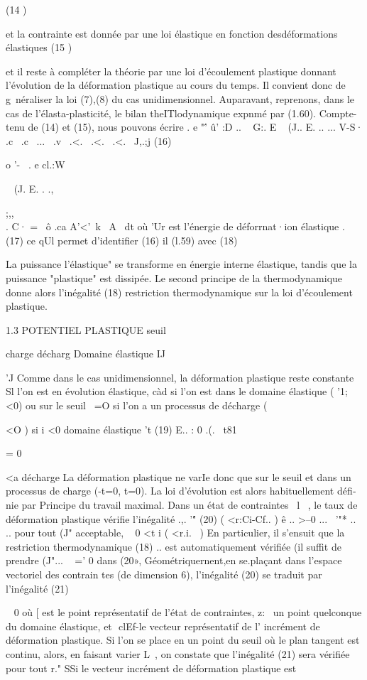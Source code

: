 {{{{{{{{{{{{{{(14 ) 

et la contrainte est donnée par une loi élastique en fonction desdéforma­tions élastiques 
(15 ) 

et il reste à compléter la théorie par une loi d'écoulement plastique don­nant l'évolution de la déformation plastique au cours du temps. Il convient donc de g~néraliser la loi (7),(8) du cas unidimensionnel. Auparavant, re­prenons, dans le cas de l'élasta-plasticité, le bilan theITlodynamique expn­mé par (1.60). Compte-tenu de (14) et (15), nous pouvons écrire 
. e "'\'­
û' :D .. ~ G:. E ~ (J.. E. .. ... V-S· 
.c~ .c~ ...~ .v~ .<.~ .<.~ .<.~ J,.;j 
(16) 


o '-~ . e cl.:W 

~
(J. E. . .,{;,,\\. C· = 
~ô .ca A'<'~k~ A~ dt 
où 'Ur est l'énergie de déforrnat·ion élastique . (17) 
ce qUl permet d'identifier (16) il (l.59) avec 
(18) 

La puissance l'élastique" se transforme en énergie interne élastique, tandis que la puissance "plastique" est dissipée. Le second principe de la thermo­dynamique donne alors l'inégalité 
(18) 
restriction thermodynamique sur la loi d'écoulement plastique. 


1.3 POTENTIEL PLASTIQUE 
seuil 

charge
décharg Domaine 
élastique 
IJ 

'J 
Comme dans le cas unidimensionnel, la déformation plastique reste constante Sl l'on est en évolution élastique, càd si l'on est dans le domai­ne élastique ( '1;<0) ou sur le seuil ~=O si l'on a un processus de dé­charge ( {<O ) 
si i <0 domaine élastique
't
(19) 	E.. : 0 .(.~ t81 {= 0 {<a décharge 
La déformation plastique ne varIe donc que sur le seuil et dans un processus 
de charge (-t=0, t=0). La loi d'évolution est alors habituellement défi­
nie par 
Principe du travail maximal. Dans un état de contraintes ~l~ , le taux de 
déformation plastique vérifie l'inégalité 
.,. 
'"\'­
(20) 	( <r:Ci-Cf.. ) ê .. >--0 
...~
'"* 
.. 	.. 
pour tout (J" acceptable, ~ 0
<t 	i ( <r.i.~ ) 
En particulier, il s'ensuit que la restriction thermodynamique (18) 
.. 
est automatiquement vérifiée (il suffit de prendre (J"... ~ =' 0 dans (20», 
Géométriquernent,en se.plaçant dans l'espace vectoriel des contrain­
tes (de dimension 6), l'inégalité (20) se traduit par l'inégalité 
(21) 

~ 0 
où [ est le point représentatif de l'état de contraintes, z:~ un point quel­conque du domaine élastique, et ­
clEf-le vecteur représentatif de l' incré­ment de déformation plastique. 
Si l'on se place en un point du seuil où le plan tangent est conti­nu, alors, en faisant varier L~, on constate que l'inégalité (21) sera vé­rifiée pour tout r." SSi le vecteur incrément de déformation plastique est 

}}}}}}}}}}}}}}}}}}
